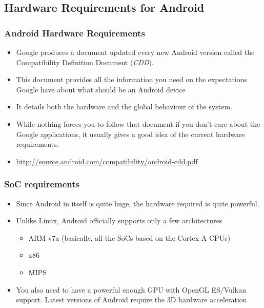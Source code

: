 \subsection{Hardware Requirements for Android}

\begin{frame}
  \frametitle{Android Hardware Requirements}
  \begin{itemize}
  \item Google produces a document updated every new Android version
    called the Compatibility Definition Document (\emph{CDD}).
  \item This document provides all the information you need on the
    expectations Google have about what should be an Android device
  \item It details both the hardware and the global behaviour of the
    system.
  \item While nothing forces you to follow that document if you don't
    care about the Google applications, it usually gives a good idea
    of the current hardware requirements.
  \item \url{http://source.android.com/compatibility/android-cdd.pdf}
  \end{itemize}
\end{frame}

\begin{frame}
  \frametitle{SoC requirements}
  \begin{itemize}
  \item Since Android in itself is quite huge, the hardware required
    is quite powerful.
  \item Unlike Linux, Android officially supports only a few
    architectures
    \begin{itemize}
    \item ARM v7a (basically, all the SoCs based on the Cortex-A CPUs)
    \item x86
    \item MIPS
    \end{itemize}
  \item You also need to have a powerful enough GPU with OpenGL ES/Vulkan
    support. Latest versions of Android require the 3D hardware
    acceleration
  \end{itemize}
\end{frame}
